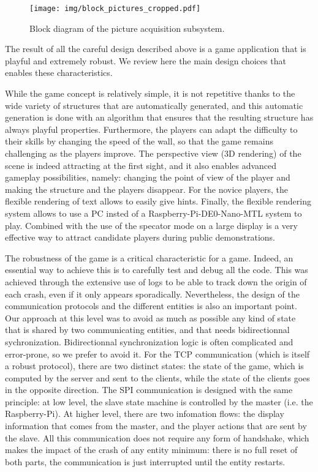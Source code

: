 \documentclass[english, DIV=13]{scrreprt}
\begin{document}
\begin{figure}[bth]
    \centering
    \texttt{[image: img/block\_pictures\_cropped.pdf]}
    \caption{Block diagram of the picture acquisition subsystem.}
\end{figure}


The result of all the careful design described above is a game application that
is playful and extremely robust. We review here the main design choices that
enables these characteristics.

While the game concept is relatively simple, it is not repetitive thanks to the
wide variety of structures that are automatically generated, and this automatic
generation is done with an algorithm that ensures that the resulting structure
has always playful properties.  Furthermore, the players can adapt the
difficulty to their skills by changing the speed of the wall, so that the game
remains challenging as the players improve.  The perspective view (3D rendering)
of the scene is indeed attracting at the first sight, and it also enables
advanced gameplay possibilities, namely: changing the point of view of the
player and making the structure and the players disappear.  For the novice
players, the flexible rendering of text allows to easily give hints.  Finally,
the flexible rendering system allows to use a PC insted of a
Raspberry-Pi-DE0-Nano-MTL system to play.  Combined with the use of the specator
mode on a large display is a very effective way to attract candidate players
during public demonstrations.

The robustness of the game is a critical characteristic for a game. Indeed, an
essential way to achieve this is to carefully test and debug all the code. This
was achieved through the extensive use of logs to be able to track down the
origin of each crash, even if it only appears sporadically.  Nevertheless, the
design of the communication protocols and the different entities is also an
important point. Our approach at this level was to avoid as much as possible any
kind of state that is shared by two communicating entities, and that needs
bidirectionnal sychronization.  Bidirectionnal synchronization logic is often
complicated and error-prone, so we prefer to avoid it.  For the TCP
communication (which is itself a robust protocol), there are two distinct
states: the state of the game, which is computed by the server and sent to the
clients, while the state of the clients goes in the opposite direction.  The SPI
communication is designed with the same principle: at low level, the slave state
machine is controlled by the master (i.e. the Raspberry-Pi). At higher level,
there are two infomation flows: the display information that comes from the
master, and the player actions that are sent by the slave. All this
communication does not require any form of handshake, which makes the impact of
the crash of any entity minimum: there is no full reset of both parts, the
communication is just interrupted until the entity restarts.
\end{document}
